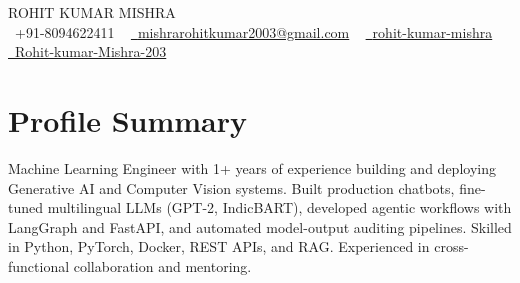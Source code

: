 \documentclass[letterpaper,11pt]{article}
\newcommand{\resumeSubHeadingListStart}{\begin{itemize}[leftmargin=0.0in, label={}]}
\newcommand{\resumeSubHeadingListEnd}{\end{itemize}}
\begin{document}

\begin{center}
    {\Huge \scshape ROHIT KUMAR MISHRA} \\ \vspace{1pt}
    \small \raisebox{-0.1\height}\faPhone\ {+91-8094622411} ~ \href{mailto:mishrarohitkumar2003@gmail.com}{\raisebox{-0.2\height}\faEnvelope\ {mishrarohitkumar2003@gmail.com}} ~ 
    \href{www.linkedin.com/in/rohit-kumar-mishra-63343421b}{\raisebox{-0.2\height}\faLinkedin\ {rohit-kumar-mishra}} ~
    \href{https://github.com/Rohit-kumar-Mishra-203}{\raisebox{-0.2\height}\faGithub\ {Rohit-kumar-Mishra-203}}
    \vspace{-8pt}
\end{center}
\section{Profile Summary}

Machine Learning Engineer with 1+ years of experience building and deploying Generative AI and Computer Vision systems. Built production chatbots, fine-tuned multilingual LLMs (GPT-2, IndicBART), developed agentic workflows with LangGraph and FastAPI, and automated model-output auditing pipelines. Skilled in Python, PyTorch, Docker, REST APIs, and RAG. Experienced in cross-functional collaboration and mentoring.
\vspace{0.5mm}


\end{document}
